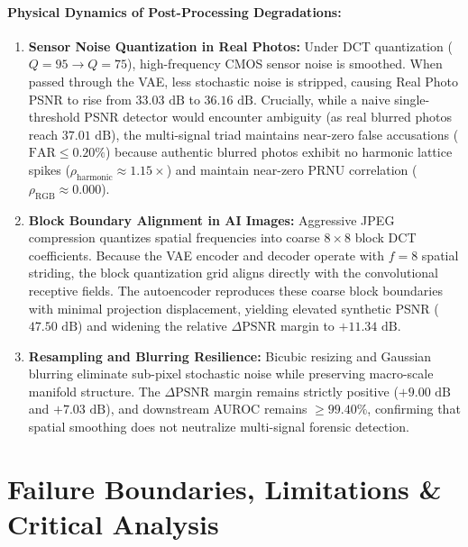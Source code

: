 \documentclass{article}
\theoremstyle{definition}
\begin{document}
\paragraph{Physical Dynamics of Post-Processing Degradations:}
\begin{enumerate}
    \item \textbf{Sensor Noise Quantization in Real Photos:} Under DCT quantization ($Q=95 \to Q=75$), high-frequency CMOS sensor noise is smoothed. When passed through the VAE, less stochastic noise is stripped, causing Real Photo PSNR to rise from $33.03\text{ dB}$ to $36.16\text{ dB}$. Crucially, while a naive single-threshold PSNR detector would encounter ambiguity (as real blurred photos reach $37.01\text{ dB}$), the multi-signal triad maintains near-zero false accusations ($\text{FAR} \le 0.20\%$) because authentic blurred photos exhibit no harmonic lattice spikes ($\rho_{\text{harmonic}} \approx 1.15\times$) and maintain near-zero PRNU correlation ($\rho_{\text{RGB}} \approx 0.000$).
    \item \textbf{Block Boundary Alignment in AI Images:} Aggressive JPEG compression quantizes spatial frequencies into coarse $8\times 8$ block DCT coefficients. Because the VAE encoder and decoder operate with $f=8$ spatial striding, the block quantization grid aligns directly with the convolutional receptive fields. The autoencoder reproduces these coarse block boundaries with minimal projection displacement, yielding elevated synthetic PSNR ($47.50\text{ dB}$) and widening the relative $\Delta\text{PSNR}$ margin to $+11.34\text{ dB}$.
    \item \textbf{Resampling and Blurring Resilience:} Bicubic resizing and Gaussian blurring eliminate sub-pixel stochastic noise while preserving macro-scale manifold structure. The $\Delta\text{PSNR}$ margin remains strictly positive ($+9.00\text{ dB}$ and $+7.03\text{ dB}$), and downstream AUROC remains $\ge 99.40\%$, confirming that spatial smoothing does not neutralize multi-signal forensic detection.
\end{enumerate}

\section{Failure Boundaries, Limitations \& Critical Analysis}
\label{sec:limitations}
\end{document}
